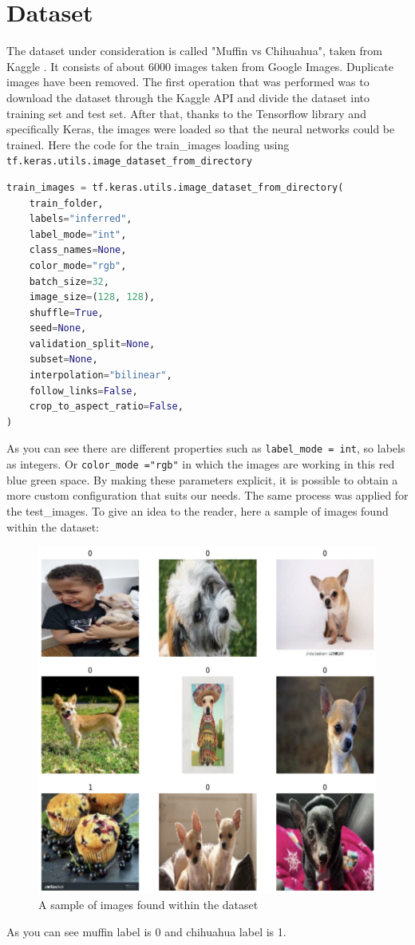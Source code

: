 \chapter{Dataset} \label{ch:dataset}
The dataset under consideration is called "Muffin vs Chihuahua", taken from Kaggle \cite{kaggle}.
It consists of about 6000 images taken from Google Images. Duplicate images have been removed.
The first operation that was performed was to download the dataset through the Kaggle API and divide the dataset into training set and test set. After that, thanks to the Tensorflow library and specifically Keras, the images were loaded so that the neural networks could be trained. Here the code for the train\_images loading using \texttt{tf.keras.utils.image\_dataset\_from\_directory}
\begin{lstlisting}[language=Python]
train_images = tf.keras.utils.image_dataset_from_directory(
    train_folder,
    labels="inferred",
    label_mode="int",
    class_names=None,
    color_mode="rgb",
    batch_size=32,
    image_size=(128, 128),
    shuffle=True,
    seed=None,
    validation_split=None,
    subset=None,
    interpolation="bilinear",
    follow_links=False,
    crop_to_aspect_ratio=False,
)
\end{lstlisting}
As you can see there are different properties such as \texttt{label\_mode = int}, so labels as integers. Or \texttt{color\_mode ="rgb"} in which the images are working in this red blue green space. By making these parameters explicit, it is possible to obtain a more custom configuration that suits our needs. The same process was applied for the test\_images.
To give an idea to the reader, here a sample of images found within the dataset:
\begin{figure}[hbtp]
\caption{A sample of images found within the dataset}
\centering
\includegraphics[scale=0.5]{../Images/sampleimages.png}
\end{figure}
As you can see muffin label is 0 and chihuahua label is 1.
